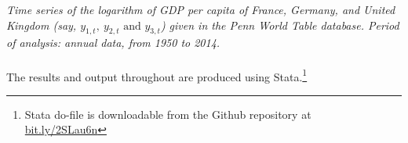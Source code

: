 \textit{Time series of the logarithm of GDP per capita of France, Germany, and United Kingdom (say, $y_{1,t},\ y_{2,t}\text{ and }y_{3,t}$) given in the Penn World Table database. Period of analysis: annual data, from 1950 to 2014.}
\\
\\
The results and output throughout are produced using Stata.\footnote{Stata do-file is downloadable from the Github repository at\\ \href{https://raw.githubusercontent.com/thornoe/ub/master/Macroeconometrics/PS2/stata_code/do_PS_2.do}{bit.ly/2SLau6n}}
